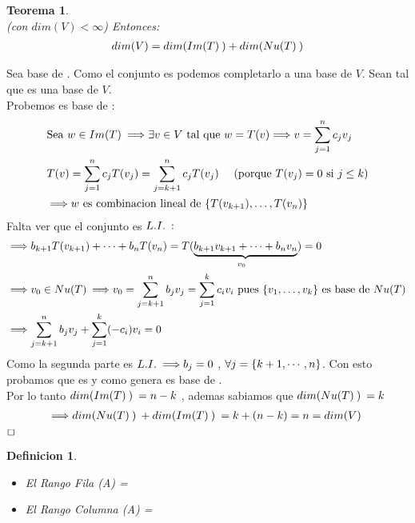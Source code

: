 \documentclass[]{article}
\newtheorem{theorem}{Teorema}
\newtheorem{definition}{Definicion}
\newenvironment{proof}{\noindent{\bf Prueba:}}{$\hfill \Box$ \vspace{10pt}}
\newcommand{\ida}{\Longrightarrow}
\begin{document}
\begin{theorem}
    \\
    (con $dim(V)<\infty$) Entonces:
    \begin{align*}
        dim(V)=dim(\text{$Im(T)$}\:)+dim(\text{$Nu(T)$}\:)
    \end{align*}
\end{theorem}
\begin{proof}
    Sea  base de . Como el conjunto es \li podemos completarlo
    a una base de $V$. Sean  tal que 
    es una base de $V$.\\
    Probemos  es base de \I :
    \begin{align*}
        &\text{Sea } w \in \I \ida \exists v \in V \text{ tal que } w=\T{v} \ida v=\sum_{j=1}^{n}c_j\vc{j}\\
        &\T{v}=\sum_{j=1}^{n}c_j\T{\vc{j}}=\sum_{j=k+1}^{n}c_j\T{\vc{j}} \quad \text{ (porque $\T{\vc{j}}=0$ si $j\leq k$)}\\
        &\ida w \text{ es combinacion lineal de } \conjunto{\T{\vc{k+1}},\dots,\T{\vc{n}}}  
    \end{align*}
    Falta ver que el conjunto es $L.I.\: :$
    \begin{align*}
        &\ida b_{k+1}\T{\vc{k+1}}+\cdots+b_n\T{\vc{n}}=\underset{\vc{0}}{\T{\underbrace{b_{k+1}v_{k+1}+\cdots+b_nv_n}}}=0\\
        &\ida \vc{0}\in \N \ida \vc{0}=\sum_{j=k+1}^{n}b_jv_j=\sum_{j=1}^{k}c_iv_i
        \text{ pues \conjunto{\vc{1},\dots,\vc{k}} es base de \N}\\
        &\ida \sum_{j=k+1}^{n}b_jv_j+\sum_{j=1}^{k}(-c_i)v_i = 0
    \end{align*}
    Como la segunda parte es $\li \ida b_j=0$ , $\forall j=\text{$\{ {k+1,\cdots,n} \}$}$. Con esto probamos que
     es \li y como genera es base de \I.\\
    Por lo tanto $\text{$dim(\text{$Im(T)$}\:)$}\:=n-k$ , ademas sabiamos que $\text{$dim(\text{$Nu(T)$}\:)$}\:=k$
    \begin{align*}
        \ida \dm{\N}+\dm{\I}=k+(n-k)=n=\dm{V}
    \end{align*}
\end{proof}

\begin{definition}
\mbox{}
    \begin{itemize}
        \item El Rango Fila (A) = 
        \item El Rango Columna (A) = 
    \end{itemize}
\end{definition}
\end{document}
